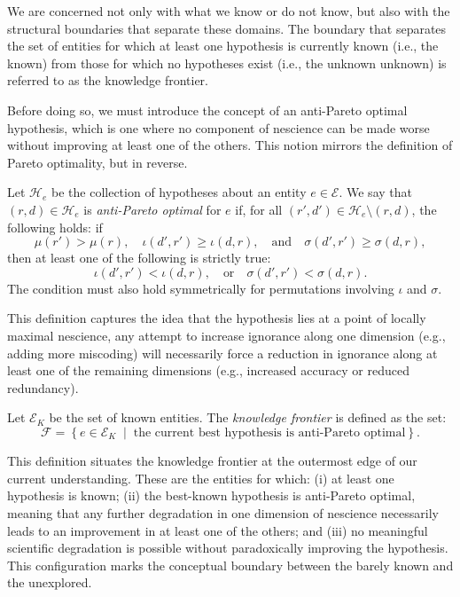 We are concerned not only with what we know or do not know, but also with the structural boundaries that separate these domains. The boundary that separates the set of entities for which at least one hypothesis is currently known (i.e., the known) from those for which no hypotheses exist (i.e., the unknown unknown) is referred to as the knowledge frontier.

Before doing so, we must introduce the concept of an anti-Pareto optimal hypothesis, which is one where no component of nescience can be made worse without improving at least one of the others. This notion mirrors the definition of Pareto optimality, but in reverse.

\begin{definition}
Let $\mathcal{H}_e$ be the collection of hypotheses about an entity $e \in \mathcal{E}$. We say that $(r, d) \in \mathcal{H}_e$ is \emph{anti-Pareto optimal} for $e$ if, for all $(r', d') \in \mathcal{H}_e \setminus {(r, d)}$, the following holds: if
\[
\mu(r') > \mu(r),\quad \iota(d', r') \geq \iota(d, r),\quad \text{and} \quad \sigma(d', r') \geq \sigma(d, r),
\]
then at least one of the following is strictly true:
\[
\iota(d', r') < \iota(d, r),\quad \text{or} \quad \sigma(d', r') < \sigma(d, r).
\]
The condition must also hold symmetrically for permutations involving $\iota$ and $\sigma$.
\end{definition}

This definition captures the idea that the hypothesis lies at a point of locally maximal nescience, any attempt to increase ignorance along one dimension (e.g., adding more miscoding) will necessarily force a reduction in ignorance along at least one of the remaining dimensions (e.g., increased accuracy or reduced redundancy).

\begin{definition}
Let $\mathcal{E}_{K}$ be the set of known entities. The \emph{knowledge frontier} is defined as the set:
\[
\mathcal{F} = \left\{ e \in \mathcal{E}_{K} \;\middle|\; \text{the current best hypothesis is anti-Pareto optimal} \right\}.
\]
\end{definition}

This definition situates the knowledge frontier at the outermost edge of our current understanding. These are the entities for which: (i) at least one hypothesis is known; (ii) the best-known hypothesis is anti-Pareto optimal, meaning that any further degradation in one dimension of nescience necessarily leads to an improvement in at least one of the others; and (iii) no meaningful scientific degradation is possible without paradoxically improving the hypothesis. This configuration marks the conceptual boundary between the barely known and the unexplored.

